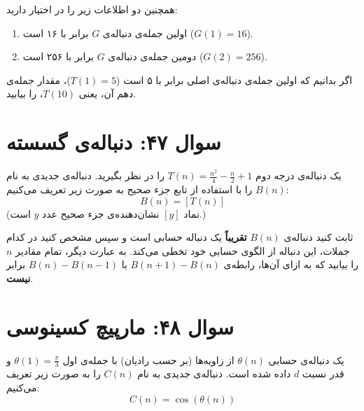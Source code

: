 \documentclass[12pt]{article}
\begin{document}
	 همچنین دو اطلاعات زیر را در اختیار دارید:
	\begin{enumerate}[label=(\roman*)]
		\item اولین جمله‌ی دنباله‌ی \(G\) برابر با ۱۶ است (\(G(1) = 16\)).
		\item دومین جمله‌ی دنباله‌ی \(G\) برابر با ۲۵۶ است (\(G(2) = 256\)).
	\end{enumerate}
	\vspace{0.5cm}
	
	اگر بدانیم که اولین جمله‌ی دنباله‌ی اصلی برابر با ۵ است (\(T(1) = 5\))، مقدار جمله‌ی دهم آن، یعنی \(T(10)\)، را بیابید.
	
	\vspace{1cm}
	\hrulefill
	\vspace{1cm}
	
	\section*{سوال ۴۷: دنباله‌ی گسسته }
	یک دنباله‌ی درجه دوم \( T(n) = \frac{n^2}{4} - \frac{n}{2} + 1 \) را در نظر بگیرید. دنباله‌ی جدیدی به نام \(B(n)\) را با استفاده از تابع جزء صحیح به صورت زیر تعریف می‌کنیم:
	\begin{displaymath}
		B(n) = [T(n)]
	\end{displaymath}
	(نماد \( [y] \) نشان‌دهنده‌ی جزء صحیح عدد \(y\) است.)
	\vspace{0.5cm}
	
	ثابت کنید دنباله‌ی \(B(n)\) \textbf{تقریباً} یک دنباله حسابی است و سپس مشخص کنید در کدام جملات، این دنباله از الگوی حسابی خود تخطی می‌کند. به عبارت دیگر، تمام مقادیر \(n\) را بیابید که به ازای آن‌ها، رابطه‌ی \( B(n+1) - B(n) \) با \( B(n) - B(n-1) \) برابر \textbf{نیست}.
	
	\vspace{1cm}
	\hrulefill
	\vspace{1cm}
	
	\section*{سوال ۴۸: مارپیچ کسینوسی }
	یک دنباله‌ی حسابی \( \theta(n) \) از زاویه‌ها (بر حسب رادیان) با جمله‌ی اول \( \theta(1) = \frac{\pi}{3} \) و قدر نسبت \(d\) داده شده است. دنباله‌ی جدیدی به نام \(C(n)\) را به صورت زیر تعریف می‌کنیم:
	\begin{displaymath}
		C(n) = \cos(\theta(n))
	\end{displaymath}
	\vspace{0.5cm}
	
\end{document}
